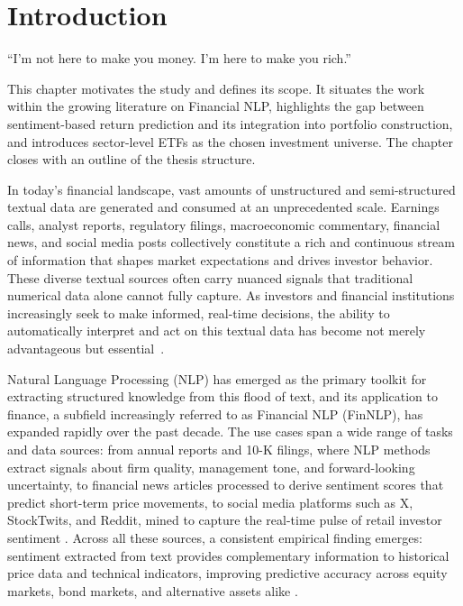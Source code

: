 \chapter{Introduction}
\label{chapter:introduction}

\begin{introduction}
\begin{flushright}
``I'm not here to make you money. I'm here to make you rich.''
\end{flushright}

\vspace{0.5em}

This chapter motivates the study and defines its scope. It situates the work within the growing literature on Financial NLP, highlights the gap between sentiment-based return prediction and its integration into portfolio construction, and introduces sector-level ETFs as the chosen investment universe. The chapter closes with an outline of the thesis structure.
\end{introduction}

In today's financial landscape, vast amounts of unstructured and semi-structured textual data are generated and consumed at an unprecedented scale. Earnings calls, analyst reports, regulatory filings, macroeconomic commentary, financial news, and social media posts collectively constitute a rich and continuous stream of information that shapes market expectations and drives investor behavior. These diverse textual sources often carry nuanced signals that traditional numerical data alone cannot fully capture. As investors and financial institutions increasingly seek to make informed, real-time decisions, the ability to automatically interpret and act on this textual data has become not merely advantageous but essential~\cite{Loughran2016, Martina25}.

Natural Language Processing (NLP) has emerged as the primary toolkit for extracting structured knowledge from this flood of text, and its application to finance, a subfield increasingly referred to as Financial NLP (FinNLP), has expanded rapidly over the past decade. The use cases span a wide range of tasks and data sources: from annual reports and 10-K filings, where NLP methods extract signals about firm quality, management tone, and forward-looking uncertainty, to financial news articles processed to derive sentiment scores that predict short-term price movements, to social media platforms such as X, StockTwits, and Reddit, mined to capture the real-time pulse of retail investor sentiment \cite{3ac6b, 9d5c9, 2a15b, a12be, cc28c}. Across all these sources, a consistent empirical finding emerges: sentiment extracted from text provides complementary information to historical price data and technical indicators, improving predictive accuracy across equity markets, bond markets, and alternative assets alike \cite{2a15b, a12be, cc28c}.

